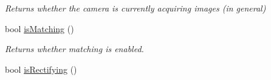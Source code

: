 \begin{DoxyCompactItemize}
\begin{DoxyCompactList}\small\item\em Returns whether the camera is currently acquiring images (in general) \end{DoxyCompactList}\item 
\hypertarget{class_abstract_stereo_camera_a0096fcc42b50aa7fa4236f6bddcd81f7}{}bool \hyperlink{class_abstract_stereo_camera_a0096fcc42b50aa7fa4236f6bddcd81f7}{is\+Matching} ()\label{class_abstract_stereo_camera_a0096fcc42b50aa7fa4236f6bddcd81f7}

\begin{DoxyCompactList}\small\item\em Returns whether matching is enabled. \end{DoxyCompactList}\item 
\hypertarget{class_abstract_stereo_camera_a5376ae9c07bdc8e048cbb83a3f11d520}{}bool \hyperlink{class_abstract_stereo_camera_a5376ae9c07bdc8e048cbb83a3f11d520}{is\+Rectifying} ()\label{class_abstract_stereo_camera_a5376ae9c07bdc8e048cbb83a3f11d520}


\end{DoxyCompactItemize}
